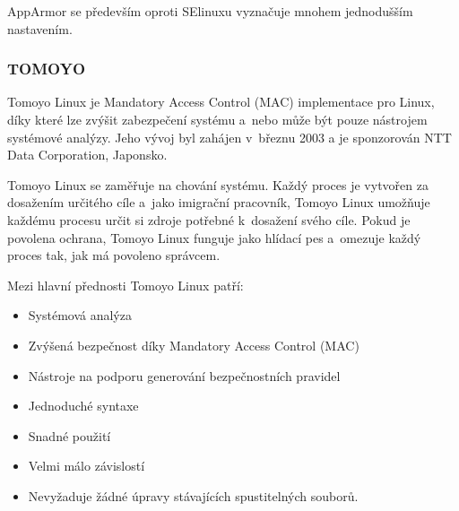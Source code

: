 \documentclass[a4paper,12pt]{article}
\begin{document}
AppArmor se především oproti SElinuxu vyznačuje mnohem jednodušším nastavením.

\subsubsection{TOMOYO}

Tomoyo Linux je Mandatory Access Control (MAC) implementace pro Linux, díky které lze zvýšit zabezpečení systému a~nebo může být pouze nástrojem systémové analýzy. Jeho vývoj byl zahájen v~březnu 2003 a je sponzorován NTT Data Corporation, Japonsko.

Tomoyo Linux se zaměřuje na chování systému. Každý proces je vytvořen za dosažením určitého cíle a~jako imigrační pracovník, Tomoyo Linux umožňuje každému procesu určit si zdroje potřebné k~dosažení svého cíle. Pokud je povolena ochrana, Tomoyo Linux funguje jako hlídací pes a~omezuje každý proces tak, jak má povoleno správcem.\cite{TOMOYOLinuxHOME}

Mezi hlavní přednosti Tomoyo Linux patří:
\begin{itemize}
 \item Systémová analýza
 \item Zvýšená bezpečnost díky Mandatory Access Control (MAC)
 \item Nástroje na podporu generování bezpečnostních pravidel
 \item Jednoduché syntaxe
 \item Snadné použití
 \item Velmi málo závislostí
 \item Nevyžaduje žádné úpravy stávajících spustitelných souborů.
\end{itemize}

\end{document}
